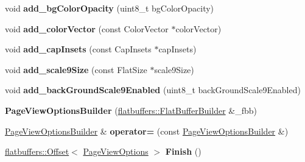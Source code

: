 \begin{DoxyCompactItemize}
\mbox{\label{structflatbuffers_1_1PageViewOptionsBuilder_abe4cadfcd64971a124a837c4a67c7649}} 
void {\bfseries add\+\_\+bg\+Color\+Opacity} (uint8\+\_\+t bg\+Color\+Opacity)
\item 
\mbox{\label{structflatbuffers_1_1PageViewOptionsBuilder_adf6c55f2f6f8c933a88020c26d291a02}} 
void {\bfseries add\+\_\+color\+Vector} (const Color\+Vector $\ast$color\+Vector)
\item 
\mbox{\label{structflatbuffers_1_1PageViewOptionsBuilder_a41d76d790eb42a65ca94b429cb582a67}} 
void {\bfseries add\+\_\+cap\+Insets} (const Cap\+Insets $\ast$cap\+Insets)
\item 
\mbox{\label{structflatbuffers_1_1PageViewOptionsBuilder_a7c0c466e04304922652f29cc5e381128}} 
void {\bfseries add\+\_\+scale9\+Size} (const Flat\+Size $\ast$scale9\+Size)
\item 
\mbox{\label{structflatbuffers_1_1PageViewOptionsBuilder_ad864bfd98fb763bc3bd1b728e6158ad2}} 
void {\bfseries add\+\_\+back\+Ground\+Scale9\+Enabled} (uint8\+\_\+t back\+Ground\+Scale9\+Enabled)
\item 
\mbox{\label{structflatbuffers_1_1PageViewOptionsBuilder_abbc5b53b20f8d0889b5c67087617f815}} 
{\bfseries Page\+View\+Options\+Builder} (\hyperlink{classflatbuffers_1_1FlatBufferBuilder}{flatbuffers\+::\+Flat\+Buffer\+Builder} \&\+\_\+fbb)
\item 
\mbox{\label{structflatbuffers_1_1PageViewOptionsBuilder_a1e8c4e581a0c9ddf8917a00a10704e67}} 
\hyperlink{structflatbuffers_1_1PageViewOptionsBuilder}{Page\+View\+Options\+Builder} \& {\bfseries operator=} (const \hyperlink{structflatbuffers_1_1PageViewOptionsBuilder}{Page\+View\+Options\+Builder} \&)
\item 
\mbox{\label{structflatbuffers_1_1PageViewOptionsBuilder_ad3e5d287c7942bdfaf0b54c5535286c9}} 
\hyperlink{structflatbuffers_1_1Offset}{flatbuffers\+::\+Offset}$<$ \hyperlink{structflatbuffers_1_1PageViewOptions}{Page\+View\+Options} $>$ {\bfseries Finish} ()
\end{DoxyCompactItemize}
